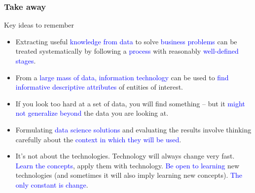 \documentclass[11pt,xcolor=svgnames]{beamer}
\begin{document}
\begin{frame}\frametitle{Take away}
  \begin{exampleblock}{Key ideas to remember}
\pause
    \begin{itemize}
    \item Extracting useful \textcolor{blue}{knowledge from data} to
      solve \textcolor{blue}{business problems} can be treated
      systematically by following a \textcolor{blue}{process} with
      reasonably \textcolor{blue}{well-defined stages}.
\pause
    \item From a \textcolor{blue}{large mass of data, information
        technology} can be used to \textcolor{blue}{find informative
        descriptive attributes} of entities of interest.
\pause
    \item If you look too hard at a set of data, you will find
      something -- but it \textcolor{blue}{might not generalize beyond} the
      data you are looking at.
\pause
    \item Formulating \textcolor{blue}{data science solutions} and
      evaluating the results involve thinking carefully about the
      \textcolor{blue}{context in which they will be used}.
\pause
    \item It's not about the technologies. Technology will always
      change very fast. \textcolor{blue}{Learn the concepts}, apply
      them with technology. \textcolor{blue}{Be open to learning} new
      technologies (and sometimes it will also imply learning new
      concepts). \textcolor{blue}{The only constant is change}.
    \end{itemize}
  \end{exampleblock}
\end{frame}


\end{document}
